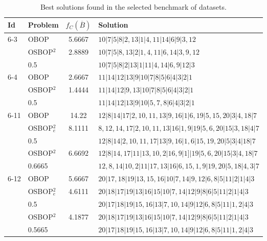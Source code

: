 \documentclass[preprint,12pt]{article}
\theoremstyle{definition}
\theoremstyle{remark}
\theoremstyle{example} %
\begin{document}
\begin{table}
\caption{\label{tab:BestSolutions}Best solutions found in the selected benchmark of datasets.}
\renewcommand{\arraystretch}{1.2} %
\smallskip
\begin{scriptsize}
\centering
\begin{tabular}{llcl}\hline
Id	&	Problem &   $f_C(\overline{B})$       & Solution 	\\  \hline
6-3	&	OBOP    &   5.6667  &       $10|7|5|8|2,13|1|4,11|14|6|9|3,12$	\\  \cline{2-4}
      &   OSBOP$^2$   &   2.8889 &    $10|7|5|8,13|2|1,4,11|6,14|3,9,12$  \\
    &   0.5      &          &       $10|7|5|8|2|13|1|11|4,14|6,9|12|3$  \\\hline
    
6-4	&	OBOP    &   2.6667  &       $11|14|12|13|9|10|7|8|5|6|4|3|2|1$	\\  \cline{2-4}
    &   OSBOP$^2$   &   1.4444 &    $11|14|12|9,13|10|7|8|5|6|4|3|2|1$  \\
    &   0.5      &          &       $11|14|12|13|9|10|5,7,8|6|4|3|2|1$  \\\hline
    
6-11	&	OBOP    & 14.22 &       $12|8|14|17|2,10,11,13|9,16|1|6,19|5,15,20|3|4,18|7$	\\  \cline{2-4}
    &   OSBOP$^2_e$   &   8.1111 &    $8,12,14,17|2,10,11,13|16|1,9|19|5,6,20|15|3,18|4|7$  \\
    &   0.5      &          &       $12|8|14|2,10,11,17|13|9,16|1,6|15,19,20|5|3|4|18|7$  \\ \cline{2-4}
    &   OSBOP$^2$   &   6.6692    &   $12|8|14, 17|11|13, 10, 2|16, 9|1]|19|5, 6, 20|15|3|4, 18|7$  \\
    &  0.6665       &          &      $12, 8, 14|10, 2|11|17, 13|16|6, 15, 1, 9|19, 20|5, 18|4, 3|7$  \\    
       
    \hline
    
6-12	&	OBOP  &  5.6667 &       $20|17,18|19|13,15,16|10|7,14|9,12|6,8|5|11|2|1|4|3$	\\  \cline{2-4}
    &   OSBOP$^2_e$  &   4.6111 &   $20|18|17|19|13|16|15|10|7,14|12|9|8|6|5|11|2|1|4|3$ \\
    &   0.5      &          &       $20|17|18|19|15,16|13|7,10,14|9|12|6,8|5|11|1,2|4|3$ \\ \cline{2-4}
    &   OSBOP$^2$   &   4.1877 &    $20|18|17|19|13|16|15|10|7,14|12|9|8|6|5|11|2|1|4|3$  \\
    &   0.5665   &          &       $20|17|18|19|15,16|13|7,10,14|9|12|6,8|5|11|1,2|4|3$  \\\hline
    

\end{tabular}
\end{scriptsize}
\end{table}
\end{document}
